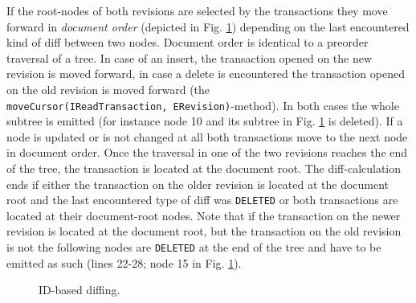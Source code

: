 If the root-nodes of both revisions are selected by the transactions they move forward in \emph{document order} (depicted in Fig. \ref{fig:id-diff}) depending on the last encountered kind of diff between two nodes. Document order is identical to a preorder traversal of a tree. In case of an insert, the transaction opened on the new revision is moved forward, in case a delete is encountered the transaction opened on the old revision is moved forward (the \\ \texttt{moveCursor(IReadTransaction, ERevision)}-method). In both cases the whole subtree is emitted (for instance node 10 and its subtree in Fig. \ref{fig:id-diff} is deleted). If a node is updated or is not changed at all both transactions move to the next node in document order. Once the traversal in one of the two revisions reaches the end of the tree, the transaction is located at the document root. The diff-calculation ends if either the transaction on the older revision is located at the document root and the last encountered type of diff was \texttt{DELETED} or both transactions are located at their document-root nodes. Note that if the transaction on the newer revision is located at the document root, but the transaction on the old revision is not the following nodes are \texttt{DELETED} at the end of the tree and have to be emitted as such (lines 22-28; node 15 in Fig. \ref{fig:id-diff}). 

\begin{figure}[tb]
\caption{\label{fig:id-diff} ID-based diffing.}
\end{figure} 

